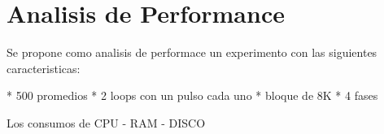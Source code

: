 \section{Analisis de Performance}


Se propone como analisis de performace un experimento con las siguientes caracteristicas:

* 500 promedios
* 2 loops con un pulso cada uno
* bloque de 8K
* 4 fases

Los consumos de CPU - RAM - DISCO
\newpage